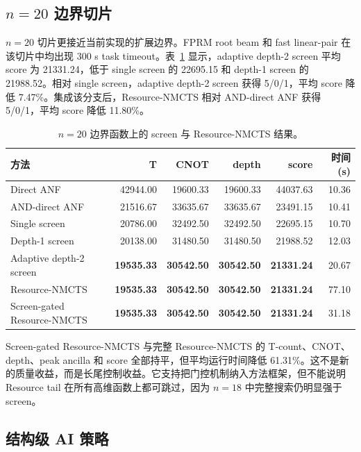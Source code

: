 \documentclass[UTF8,fontset=macnew,11pt]{ctexart}
\newcommand{\method}{Resource-NMCTS}
\begin{document}
\subsection{\texorpdfstring{$n=20$}{n=20} 边界切片}

$n=20$ 切片更接近当前实现的扩展边界。FPRM root beam 和 fast linear-pair 在该切片中均出现 300 s task timeout。表~\ref{tab:n20} 显示，adaptive depth-2 screen 平均 score 为 21331.24，低于 single screen 的 22695.15 和 depth-1 screen 的 21988.52。相对 single screen，adaptive depth-2 screen 获得 5/0/1，平均 score 降低 7.47\%。集成该分支后，\method{} 相对 AND-direct ANF 获得 5/0/1，平均 score 降低 11.80\%。

\begin{table}[t]
\centering
\scriptsize
\caption{$n=20$ 边界函数上的 screen 与 \method{} 结果。}
\label{tab:n20}
\begin{tabularx}{\linewidth}{>{\raggedright\arraybackslash}Xrrrrr}
\toprule
方法 & T & CNOT & depth & score & 时间(s) \\
\midrule
Direct ANF & 42944.00 & 19600.33 & 19600.33 & 44037.63 & 10.36 \\
AND-direct ANF & 21516.67 & 33635.67 & 33635.67 & 23491.15 & 10.41 \\
Single screen & 20786.00 & 32492.50 & 32492.50 & 22695.15 & 10.70 \\
Depth-1 screen & 20138.00 & 31480.50 & 31480.50 & 21988.52 & 12.03 \\
Adaptive depth-2 screen & \textbf{19535.33} & \textbf{30542.50} & \textbf{30542.50} & \textbf{21331.24} & 20.67 \\
\method{} & \textbf{19535.33} & \textbf{30542.50} & \textbf{30542.50} & \textbf{21331.24} & 77.10 \\
Screen-gated \method{} & \textbf{19535.33} & \textbf{30542.50} & \textbf{30542.50} & \textbf{21331.24} & 31.18 \\
\bottomrule
\end{tabularx}
\end{table}

Screen-gated \method{} 与完整 \method{} 的 T-count、CNOT、depth、peak ancilla 和 score 全部持平，但平均运行时间降低 61.31\%。这不是新的质量收益，而是长尾控制收益。它支持把门控机制纳入方法框架，但不能说明 Resource tail 在所有高维函数上都可跳过，因为 $n=18$ 中完整搜索仍明显强于 screen。

\subsection{结构级 AI 策略}
\end{document}
